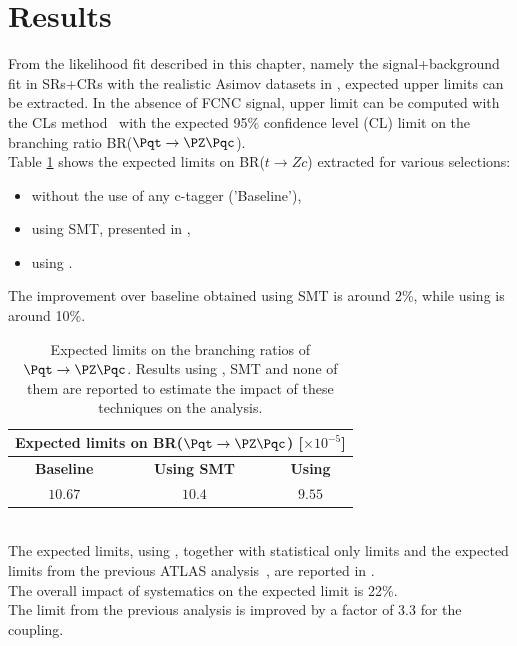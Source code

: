 \section{Results}
\label{sec:stat:tzc}
From the likelihood fit described in this chapter, namely the
signal+background fit in SRs+CRs with the realistic Asimov datasets in ,
expected upper limits can be extracted. In the absence of
FCNC signal, upper limit can be computed with the CLs method~\cite{Junk:1999kv,Read:2002hq} with the expected 95\% confidence level (CL) limit on the branching ratio BR($\Pqt\rightarrow\PZ\Pqc$).\\ 
Table \ref{tab:limits:comparison} shows the expected limits on BR($t \rightarrow Zc$) extracted for various selections: 
\begin{itemize}
\item without the use of any c-tagger ('Baseline'),
\item using SMT, presented in ,
\item using \DLrc.
\end{itemize}
The improvement over baseline obtained using SMT is around 2\%, while using \DLrc is around 10\%.
\begin{table}[htbp]
	\centering
	\begin{tabular}{c|c|c}
		\toprule
		\multicolumn{3}{c}{Expected limits on BR($\Pqt\rightarrow\PZ\Pqc$) [$ \times 10^{-5}$] }\\
		\toprule
		 \textbf{Baseline}          & \textbf{Using SMT}			& \textbf{Using \DLrc} \\
		 \midrule
		 $10.67 $ 	& $ 10.4 $   & $  9.55 $\\
		\bottomrule
	\end{tabular}
	\caption{ Expected limits on the branching ratios of $\Pqt\rightarrow\PZ\Pqc$. 
					Results using \DLrc, SMT and none of them are reported to estimate the impact of these techniques on the analysis.  }%
	\label{tab:limits:comparison}
\end{table}
\\The expected limits, using \DLrc, together
with statistical only limits and the expected limits from the previous ATLAS
analysis~\cite{TOPQ-2017-06}, are reported in
.\\
The overall impact of systematics on the expected limit is 22\%.\\
The limit from the previous analysis is improved by a factor of 3.3 for the \tZc coupling.
